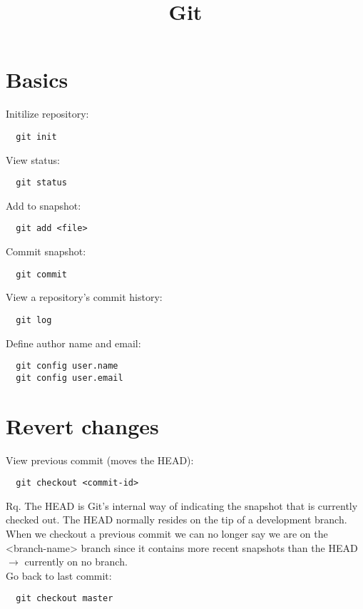 \documentclass[french]{article}
\title{Git}
\begin{document}
\date{}

\maketitle

\setlength{\parindent}{0cm}

\section{Basics}

Initilize repository:
\begin{verbatim}
  git init
\end{verbatim}

View status:
\begin{verbatim}
  git status
\end{verbatim}

Add to snapshot:
\begin{verbatim}
  git add <file>
\end{verbatim}

Commit snapshot:
\begin{verbatim}
  git commit
\end{verbatim}

View a repository's commit history:
\begin{verbatim}
  git log
\end{verbatim}

Define author name and email:
\begin{verbatim}
  git config user.name
  git config user.email
\end{verbatim}

\section{Revert changes}

View previous commit (moves the HEAD):
\begin{verbatim}
  git checkout <commit-id>
\end{verbatim}
Rq. The HEAD is Git's internal way of indicating the snapshot that is currently checked out. The HEAD normally resides on the tip of a development branch. When we checkout a previous commit we can no longer say we are on the <branch-name> branch since it contains more recent snapshots than the HEAD $\rightarrow$ currently on no branch.\\

Go back to last commit:
\begin{verbatim}
  git checkout master
\end{verbatim}
\end{document}

